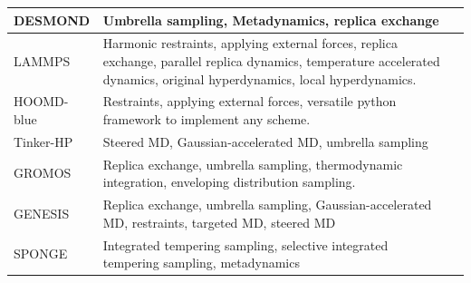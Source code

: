 \documentclass[9pt,review]{livecoms}
\begin{document}
\begin{table}[!ht]
\begin{tabularx}{0.95\textwidth}{
  || >{\raggedright\arraybackslash} l
  || >{\raggedright\arraybackslash}X
  | >{\raggedright\arraybackslash}l ||}
\hline
DESMOND & Umbrella sampling, Metadynamics, replica exchange & \cite{Desmond2006} \\
\hline
LAMMPS  & Harmonic restraints, applying external forces, replica exchange, parallel replica dynamics, temperature accelerated dynamics, original hyperdynamics, local hyperdynamics. &  \cite{LAMMPS_2022}\\
\hline
HOOMD-blue &  Restraints, applying external forces, versatile python framework to implement any scheme. & \cite{HOOMD-blue_2020} \\
\hline
Tinker-HP & Steered MD, Gaussian-accelerated MD, umbrella sampling & \cite{Celerse2019,Celerse2021} \\
\hline
GROMOS & Replica exchange, umbrella sampling, thermodynamic integration, enveloping distribution sampling.  & \cite{Gromos_2012} \\
\hline
GENESIS & Replica exchange, umbrella sampling, Gaussian-accelerated MD, restraints, targeted MD, steered MD  & \cite{GENESIS_MD_Code_2017} \\
\hline
SPONGE & Integrated tempering sampling, selective integrated tempering sampling, metadynamics & \cite{SPONGE_MD_Code_2022} \\
\hline
\end{tabularx}
\end{table}
\end{document}

